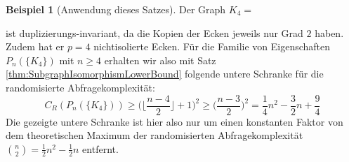 \documentclass[10pt,a4paper, footheight=1mm, bibliography=totoc]{scrreprt}
\theoremstyle{definition}
\newtheorem{examplex}{Beispiel}
\newenvironment{example}[1]
{ \begin{leftbar} \begin{examplex}#1}
{ \end{examplex} \ignorespacesafterend \end{leftbar} }
\begin{document}
\begin{example}[Anwendung dieses Satzes]
Der Graph $K_4 =$
 ist duplizierungs-invariant, da die Kopien
der Ecken jeweils nur Grad $2$ haben. Zudem
hat er $p=4$ nichtisolierte Ecken. Für die Familie von
Eigenschaften $P_n(\{K_4\})$ mit $ n\geq 4$ erhalten wir also
mit Satz \ref{thm:SubgraphIsomorphismLowerBound} folgende
untere Schranke für die randomisierte Abfragekomplexität:
$$ C_R(P_n(\{K_4\})) \geq 
\Big ( \Big \lfloor  \frac{n-4}{2} \Big \rfloor + 1 \Big ) ^2 \geq
\Big ( \frac{n-3}{2} \Big ) ^2 = 
\frac{1}{4} n^2 - \frac{3}{2} n + \frac{9}{4} 
$$
Die gezeigte untere Schranke ist hier also nur um einen
konstanten Faktor von dem theoretischen Maximum
der randomisierten Abfragekomplexität
$\binom{n}{2} = \frac{1}{2}n^2 - \frac{1}{2}n$
entfernt.
\end{example}
\end{document}
